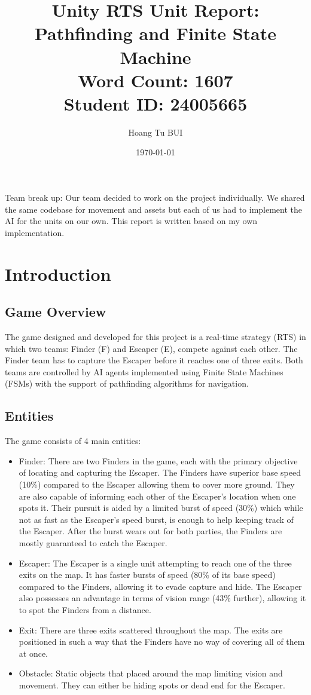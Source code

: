 \documentclass[a4paper,12pt]{article}
\title{Unity RTS Unit Report: Pathfinding and Finite State Machine
\\ \small Word Count: 1607 
\\ Student ID: 24005665}
\author{Hoang Tu BUI}
\date{\today}
\begin{document}
\maketitle
\tableofcontents
\newpage

Team break up: Our team decided to work on the project individually. We shared the same codebase for movement and assets but each of us had to implement the AI for the units on our own. This report is written based on my own implementation.



\section{Introduction}


\subsection{Game Overview}
The game designed and developed for this project is a real-time strategy (RTS) in which two teams: Finder (F) and Escaper (E), compete against each other. 
The Finder team has to capture the Escaper before it reaches one of three exits.
Both teams are controlled by AI agents implemented using Finite State Machines (FSMs) with the support of pathfinding algorithms for navigation.


\subsection{Entities}
The game consists of 4 main entities:
\begin{itemize}
    \item Finder: 
    There are two Finders in the game, each with the primary objective of locating and capturing the Escaper.
    The Finders have superior base speed (10\%) compared to the Escaper allowing them to cover more ground.
    They are also capable of informing each other of the Escaper's location when one spots it.
    Their pursuit is aided by a limited burst of speed (30\%) which while not as fast as the Escaper's speed burst, is enough to help keeping track of the Escaper.
    After the burst wears out for both parties, the Finders are mostly guaranteed to catch the Escaper.
    
    \item Escaper: 
    The Escaper is a single unit attempting to reach one of the three exits on the map.
    It has faster bursts of speed (80\% of its base speed) compared to the Finders, allowing it to evade capture and hide.
    The Escaper also possesses an advantage in terms of vision range (43\% further), allowing it to spot the Finders from a distance.
    
    \item Exit: 
    There are three exits scattered throughout the map. 
    The exits are positioned in such a way that the Finders have no way of covering all of them at once.
    
    \item Obstacle: 
    Static objects that placed around the map limiting vision and movement. 
    They can either be hiding spots or dead end for the Escaper.
\end{itemize}
\end{document}
